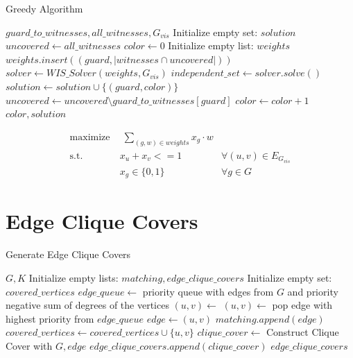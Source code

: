 \begin{algorithm}
\caption{Greedy Algorithm}\label{alg:greedy}
\begin{algorithmic}[1]
\REQUIRE $guard\_to\_witnesses, all\_witnesses, G_{vis}$
\STATE Initialize empty set: $solution$
\STATE $uncovered\gets all\_witnesses$
\STATE $color\gets 0$
    \STATE Initialize empty list: $weights$
        \STATE $weights.insert((guard, |witnesses\cap uncovered|))$
    \ENDFOR
    \STATE $solver\gets WIS\_Solver(weights, G_{vis})$
    \STATE $independent\_set\gets solver.solve()$
        \STATE $solution\gets solution\cup \{(guard, color)\}$
        \STATE $uncovered\gets uncovered\setminus guard\_to\_witnesses[guard]$
    \ENDFOR 
    \STATE $color\gets color + 1$
\ENDWHILE
\RETURN $color, solution$
\end{algorithmic}
\end{algorithm}

\begin{align}
\label{eq_MIP:f.0} \mbox{maximize}~& \;\sum_{(g, w)\in weights} x_{g}\cdot w& \\
\label{eq_MIP:f.1} \mbox{s.t. } &x_{u} + x_{v} <= 1 & \forall (u,v) \in E_{G_{vis}}\\
\label{eq_MIP:f.6}& x_{g} \in \{0,1\} & \forall g\in G
\end{align}

\section{Edge Clique Covers}

\begin{algorithm}
\caption{Generate Edge Clique Covers}
\begin{algorithmic}[1]
\REQUIRE $G, K$
\STATE Initialize empty lists: $matching, edge\_clique\_covers$
\STATE Initialize empty set: $covered\_vertices$
\STATE $edge\_queue\gets$ priority queue with edges from $G$ and priority negative sum of degrees of the vertices
    \STATE $(u, v)\gets$ 
        \STATE $(u, v)\gets$ pop edge with highest priority from $edge\_queue$
    \ENDWHILE
    \STATE $edge\gets (u, v)$
    \STATE $matching.append(edge)$
    \STATE $covered\_vertices\gets covered\_vertices\cup \{u, v\}$
\ENDFOR
{}
    \STATE $clique\_cover\gets$ Construct Clique Cover with $G, edge$
    \STATE $edge\_clique\_covers.append(clique\_cover)$
\ENDFOR
\RETURN $edge\_clique\_covers$
\end{algorithmic}
\end{algorithm}

